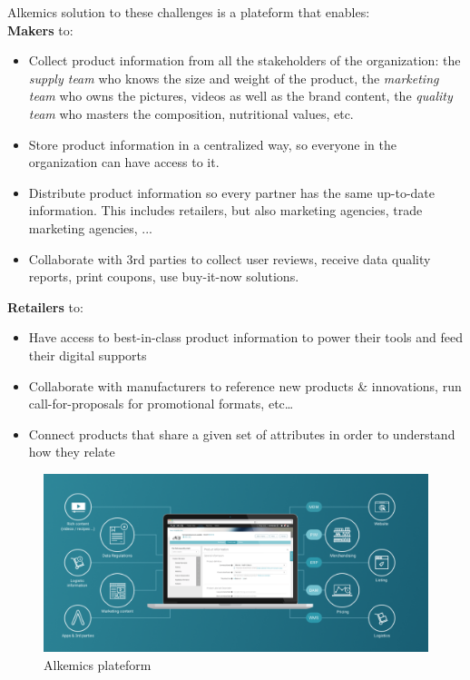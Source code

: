 Alkemics solution to these challenges is a plateform that enables:
\\

\textbf{Makers} to:
    \begin{itemize}
    \item Collect product information from all the stakeholders of the organization: the \textit{supply team} who knows the size and weight of the product, the \textit{marketing team} who owns the pictures, videos as well as the brand content, the \textit{quality team} who masters the composition, nutritional values, etc.
    \item Store product information in a centralized way, so everyone in the organization can have access to it.
    \item Distribute product information so every partner has the same up-to-date information. This includes retailers, but also marketing agencies, trade marketing agencies, ...
    \item Collaborate with 3rd parties to collect user reviews,  receive data quality reports,  print coupons, use buy-it-now solutions.
    \end{itemize}

\textbf{Retailers} to:
    \begin{itemize}
    \item Have access to best-in-class product information to power their tools and feed their digital supports 
    \item Collaborate with manufacturers to reference new products \& innovations, run call-for-proposals for promotional formats, etc…
    \item Connect products that share a given set of attributes in order to understand how they relate
    \end{itemize}

\begin{figure}[H]
\centering
\includegraphics[scale=0.35]{./images/alkemics_website_global.png}
\caption{Alkemics plateform}
\end{figure}


